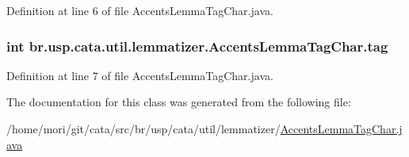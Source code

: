 Definition at line 6 of file Accents\+Lemma\+Tag\+Char.\+java.

\hypertarget{classbr_1_1usp_1_1cata_1_1util_1_1lemmatizer_1_1_accents_lemma_tag_char_a981cdf1906e4be8c3b8573851db24f26}{
\subsubsection[{tag}]{\setlength{\rightskip}{0pt plus 5cm}int br.\+usp.\+cata.\+util.\+lemmatizer.\+Accents\+Lemma\+Tag\+Char.\+tag\hspace{0.3cm}{\ttfamily [private]}}}\label{classbr_1_1usp_1_1cata_1_1util_1_1lemmatizer_1_1_accents_lemma_tag_char_a981cdf1906e4be8c3b8573851db24f26}


Definition at line 7 of file Accents\+Lemma\+Tag\+Char.\+java.



The documentation for this class was generated from the following file\+:\begin{DoxyCompactItemize}
\item 
/home/mori/git/cata/src/br/usp/cata/util/lemmatizer/\hyperlink{_accents_lemma_tag_char_8java}{Accents\+Lemma\+Tag\+Char.\+java}\end{DoxyCompactItemize}
